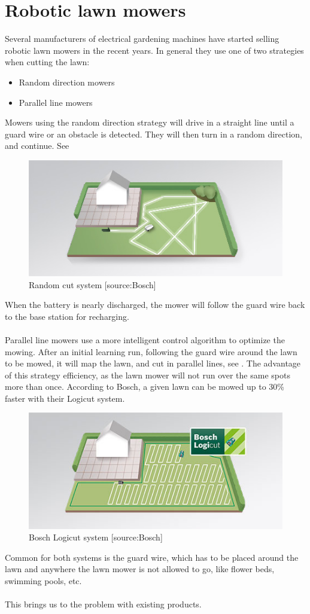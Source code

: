 \section{Robotic lawn mowers}
Several manufacturers of electrical gardening machines have started selling robotic lawn mowers in the recent years. In general they use one of two strategies when cutting the lawn:
\begin{itemize}
	\item Random direction mowers
	\item Parallel line mowers
\end{itemize}

Mowers using the random direction strategy will drive in a straight line until a guard wire or an obstacle is detected. They will then turn in a random direction, and continue. See 

\begin{figure}[H]
\centering
\includegraphics[scale=0.8]{figures/noLogiCut.jpg} 
\caption{Random cut system [source:Bosch]} 
\label{randomcut}
\end{figure}
\noindent


When the battery is nearly discharged, the mower will follow the guard wire back to the base station for recharging.\\\\
%
Parallel line mowers use a more intelligent control algorithm to optimize the mowing. After an initial learning run, following the guard wire around the lawn to be mowed, it will map the lawn, and cut in parallel lines, see . The advantage of this strategy efficiency, as the lawn mower will not run over the same spots more than once. According to Bosch, a given lawn can be mowed up to 30\% faster with their Logicut system.
 

\begin{figure}[H]
\centering
\includegraphics[scale=0.8]{figures/logicut.jpg} 
\caption{Bosch Logicut system [source:Bosch]}
\label{fig:logicut}
\end{figure}
\noindent

Common for both systems is the guard wire, which has to be placed around the lawn and anywhere the lawn mower is not allowed to go, like flower beds, swimming pools, etc. \\\\
%
This brings us to the problem with existing products.
